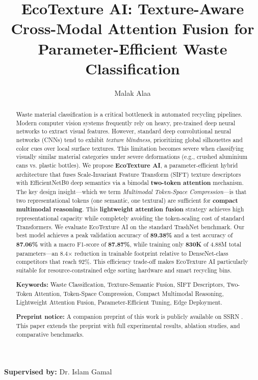 \documentclass[12pt, a4paper]{article}
\title{EcoTexture AI: Texture-Aware Cross-Modal Attention Fusion for Parameter-Efficient Waste Classification}
\author{Malak Alaa}
\affil{Department of Artificial Intelligence, Faculty of Computer Science and AI, Capital University}
\date{}
\newcommand{\supervisor}[1]{\textbf{Supervised by:} #1}
\begin{document}
\maketitle

\begin{center}
    \supervisor{Dr. Islam Gamal}
\end{center}
\vspace{1.5em}

\begin{abstract}
Waste material classification is a critical bottleneck in automated recycling pipelines. Modern computer vision systems frequently rely on heavy, pre-trained deep neural networks to extract visual features. However, standard deep convolutional neural networks (CNNs) tend to exhibit \emph{texture blindness}, prioritizing global silhouettes and color cues over local surface textures. This limitation becomes severe when classifying visually similar material categories under severe deformations (e.g., crushed aluminium cans vs. plastic bottles). We propose \textbf{EcoTexture AI}, a parameter-efficient hybrid architecture that fuses Scale-Invariant Feature Transform (SIFT) texture descriptors with EfficientNetB0 deep semantics via a bimodal \textbf{two-token attention} mechanism. The key design insight---which we term \emph{Multimodal Token-Space Compression}---is that two representational tokens (one semantic, one textural) are sufficient for \textbf{compact multimodal reasoning}. This \textbf{lightweight attention fusion} strategy achieves high representational capacity while completely avoiding the token-scaling cost of standard Transformers. We evaluate EcoTexture AI on the standard TrashNet benchmark. Our best model achieves a peak validation accuracy of \textbf{89.38\%} and a test accuracy of \textbf{87.06\%} with a macro F1-score of \textbf{87.87\%}, while training only \textbf{830K} of 4.88M total parameters---an 8.4$\times$ reduction in trainable footprint relative to DenseNet-class competitors that reach 92\%. This efficiency trade-off makes EcoTexture AI particularly suitable for resource-constrained edge sorting hardware and smart recycling bins.
\bigskip

\noindent \textbf{Keywords:} Waste Classification, Texture-Semantic Fusion, SIFT Descriptors, Two-Token Attention, Token-Space Compression, Compact Multimodal Reasoning, Lightweight Attention Fusion, Parameter-Efficient Tuning, Edge Deployment.

\bigskip
\noindent \textbf{Preprint notice:} A companion preprint of this work is publicly available on SSRN \citep{alaa2026ecotexture}. This paper extends the preprint with full experimental results, ablation studies, and comparative benchmarks.
\end{abstract}
\end{document}
